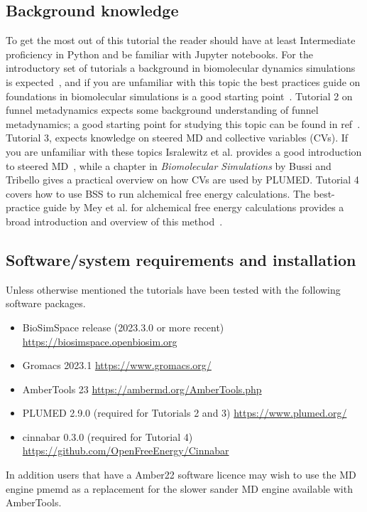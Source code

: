 \documentclass[9pt,tutorial,pubversion]{livecoms}
\begin{document}
\subsection{Background knowledge}
To get the most out of this tutorial the reader should have at least Intermediate proficiency in Python and be familiar with Jupyter notebooks. For the introductory set of tutorials a background in biomolecular dynamics simulations is expected~\cite{Huggins2018}, and if you are unfamiliar with this topic the best practices guide on foundations in biomolecular simulations is a good starting point~\cite{Braun2019}. Tutorial 2 on funnel metadynamics expects some background understanding of funnel metadynamics; a good starting point for studying this topic can be found in ref~\cite{Limongelli2013}. Tutorial 3, expects knowledge on steered MD and collective variables (CVs). If you are unfamiliar with these topics Isralewitz et al. provides a good introduction to steered MD~\cite{Isralewitz2001}, while a chapter in \textit{Biomolecular Simulations} by Bussi and Tribello gives a practical overview on how CVs are used by PLUMED\cite{Bussi2019}. Tutorial 4 covers how to use BSS to run alchemical free energy calculations. The best-practice guide by Mey et al. for alchemical free energy calculations provides a broad introduction and overview of this method~\cite{mey2020best}.

\subsection{Software/system requirements and installation}

Unless otherwise mentioned the tutorials have been tested with the following 
software packages.

\begin{itemize}
    \item BioSimSpace release (2023.3.0 or more recent)  \url{https://biosimspace.openbiosim.org}
    \item Gromacs 2023.1 \url{https://www.gromacs.org/}
    \item AmberTools 23  \url{https://ambermd.org/AmberTools.php}
    \item PLUMED 2.9.0 (required for Tutorials 2 and 3) \url{https://www.plumed.org/}
    \item cinnabar 0.3.0 (required for Tutorial 4) \url{https://github.com/OpenFreeEnergy/Cinnabar} 
\end{itemize}

In addition users that have a Amber22 software licence may wish to use the MD engine pmemd as a replacement for the slower sander MD engine available with AmberTools.
\end{document}
